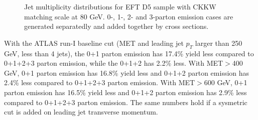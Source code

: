 \begin{figure}[h!]
	\centering  
	\hfill
	\hfill
	\caption{Jet multiplicity distributions for EFT D5 sample with CKKW matching scale at 80 GeV. 0-, 1-, 2- and 3-parton 
		emission cases are generated separatedly and added together by cross sections.}
	\label{fig:RatioKine_D5_2}
\end{figure}

With the ATLAS run-I baseline cut (MET and leading jet $p_{T}$ larger than 250 GeV, less than 4 jets), the 0+1 parton emission has 17.4\% yield less compared to 0+1+2+3 parton emission, while the 0+1+2 has 2.2\% less. With MET$>$400 GeV, 0+1 parton emission has 16.8\% yield less and 0+1+2 parton emission has 2.4\% less compared to 0+1+2+3 parton emission. With MET$>$600 GeV, 0+1 parton emission has 16.5\% yield less and 0+1+2 parton emission has 2.9\% less compared to 0+1+2+3 parton emission. The same numbers hold if a sysmetric cut is added on leading jet transverse momentum.
